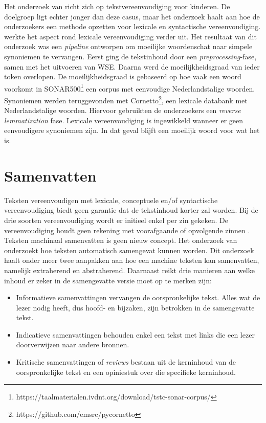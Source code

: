 Het onderzoek van \textcite{DeBelder2010} richt zich op tekstvereenvoudiging voor kinderen. De doelgroep ligt echter jonger dan deze casus, maar het onderzoek haalt aan hoe de onderzoekers een methode opzetten voor lexicale en syntactische vereenvoudiging. \textcite{Bulte2018} werkte het aspect rond lexicale vereenvoudiging verder uit. Het resultaat van dit onderzoek was een \textit{pipeline} ontworpen om moeilijke woordenschat naar simpele synoniemen te vervangen. Eerst ging de tekstinhoud door een \textit{preprocessing}-fase, samen met het uitvoeren van WSE. Daarna werd de moeilijkheidsgraad van ieder token overlopen. De moeilijkheidsgraad is gebaseerd op hoe vaak een woord voorkomt in SONAR500\footnote{https://taalmaterialen.ivdnt.org/download/tstc-sonar-corpus/} een corpus met eenvoudige Nederlandstalige woorden. Synoniemen werden teruggevonden met Cornetto\footnote{https://github.com/emsrc/pycornetto}, een lexicale databank met Nederlandstalige woorden. Hiervoor gebruikten de onderzoekers een \textit{reverse lemmatization} fase. Lexicale vereenvoudiging is ingewikkeld wanneer er geen eenvoudigere synoniemen zijn. In dat geval blijft een moeilijk woord voor wat het is.

\section{Samenvatten}

Teksten vereenvoudigen met lexicale, conceptuele en/of syntactische vereenvoudiging biedt geen garantie dat de tekstinhoud korter zal worden. Bij de drie soorten vereenvoudiging wordt er initieel enkel per zin gekeken. De vereenvoudiging houdt geen rekening met voorafgaande of opvolgende zinnen \autocite{Dubay2004}. Teksten machinaal samenvatten is geen nieuw concept. Het onderzoek van \textcite{Hahn2000} onderzoekt hoe teksten automatisch samengevat kunnen worden. Dit onderzoek haalt onder meer twee aanpakken aan hoe een machine teksten kan samenvatten, namelijk extraherend en abstraherend. Daarnaast reikt \textcite{Hahn2000} drie manieren aan welke inhoud er zeker in de samengevatte versie moet op te merken zijn:

\begin{itemize}
	\item Informatieve samenvattingen vervangen de oorspronkelijke tekst. Alles wat de lezer nodig heeft, dus hoofd- en bijzaken, zijn betrokken in de samengevatte tekst.
	\item Indicatieve samenvattingen behouden enkel een tekst met links die een lezer doorverwijzen naar andere bronnen. 
	\item Kritische samenvattingen of \textit{reviews} bestaan uit de kerninhoud van de oorspronkelijke tekst en een opiniestuk over die specifieke kerninhoud.
\end{itemize}


